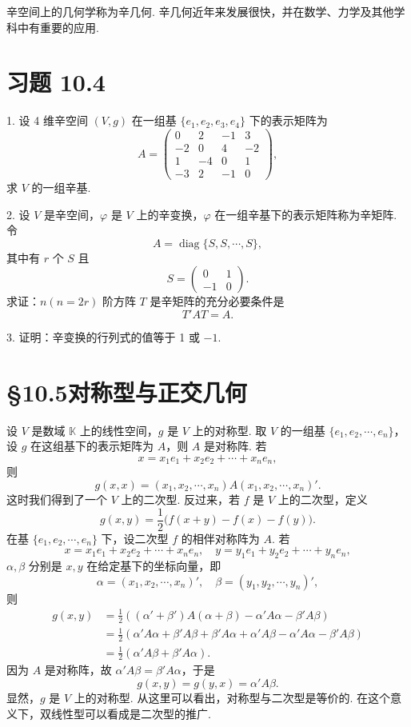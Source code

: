 \documentclass[UTF8,12pt,a4paper,fontset=fandol]{ctexart}
\begin{document}
辛空间上的几何学称为辛几何. 辛几何近年来发展很快，并在数学、力学及其他学科中有重要的应用.

\section*{习题 10.4}

1. 设 4 维辛空间 $(V,g)$ 在一组基 $\{e_1,e_2,e_3,e_4\}$ 下的表示矩阵为
\[
  A=\left(\begin{array}{rrrr}
  0&2&-1&3\\
  -2&0&4&-2\\
  1&-4&0&1\\
  -3&2&-1&0
  \end{array}\right),
\]
求 $V$ 的一组辛基.

2. 设 $V$ 是辛空间，$\varphi$ 是 $V$ 上的辛变换，$\varphi$ 在一组辛基下的表示矩阵称为辛矩阵. 令
\[
  A=\operatorname{diag}\{S,S,\cdots,S\},
\]
其中有 $r$ 个 $S$ 且
\[
  S=\left(\begin{array}{rr}
  0&1\\
  -1&0
  \end{array}\right).
\]
求证：$n(n=2r)$ 阶方阵 $T$ 是辛矩阵的充分必要条件是
\[
  T'AT=A.
\]

3. 证明：辛变换的行列式的值等于 1 或 $-1$.

\section*{§10.5\quad 对称型与正交几何}

设 $V$ 是数域 $\mathbb K$ 上的线性空间，$g$ 是 $V$ 上的对称型. 取 $V$ 的一组基 $\{e_1,e_2,\cdots,e_n\}$，设 $g$ 在这组基下的表示矩阵为 $A$，则 $A$ 是对称阵. 若
\[
  x=x_1e_1+x_2e_2+\cdots+x_ne_n,
\]
则
\[
  g(x,x)=(x_1,x_2,\cdots,x_n)A(x_1,x_2,\cdots,x_n)'.
\]
这时我们得到了一个 $V$ 上的二次型. 反过来，若 $f$ 是 $V$ 上的二次型，定义
\[
  g(x,y)=\frac12\bigl(f(x+y)-f(x)-f(y)\bigr).
\]
在基 $\{e_1,e_2,\cdots,e_n\}$ 下，设二次型 $f$ 的相伴对称阵为 $A$. 若
\[
  x=x_1e_1+x_2e_2+\cdots+x_ne_n,\quad y=y_1e_1+y_2e_2+\cdots+y_ne_n,
\]
$\alpha,\beta$ 分别是 $x,y$ 在给定基下的坐标向量，即
\[
  \alpha=(x_1,x_2,\cdots,x_n)',\quad \beta=(y_1,y_2,\cdots,y_n)',
\]
则
\[
\begin{aligned}
  g(x,y)&=\frac12\left((\alpha'+\beta')A(\alpha+\beta)-\alpha'A\alpha-\beta'A\beta\right)\\
  &=\frac12(\alpha'A\alpha+\beta'A\beta+\beta'A\alpha+\alpha'A\beta-\alpha'A\alpha-\beta'A\beta)\\
  &=\frac12(\alpha'A\beta+\beta'A\alpha).
\end{aligned}
\]
因为 $A$ 是对称阵，故 $\alpha'A\beta=\beta'A\alpha$，于是
\[
  g(x,y)=g(y,x)=\alpha'A\beta.
\]
显然，$g$ 是 $V$ 上的对称型. 从这里可以看出，对称型与二次型是等价的. 在这个意义下，双线性型可以看成是二次型的推广.
\end{document}
